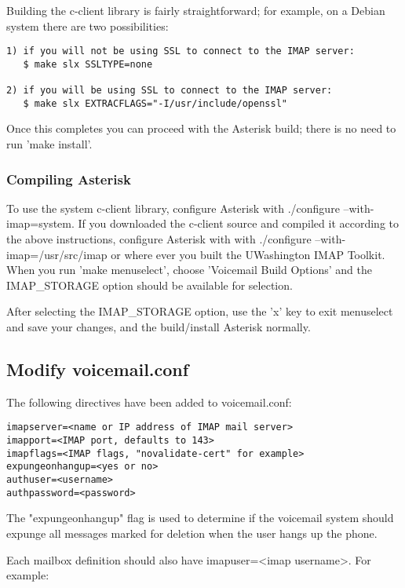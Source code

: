 Building the c-client library is fairly straightforward; for example, on a
Debian system there are two possibilities:

\begin{verbatim}
1) if you will not be using SSL to connect to the IMAP server:
   $ make slx SSLTYPE=none

2) if you will be using SSL to connect to the IMAP server:
   $ make slx EXTRACFLAGS="-I/usr/include/openssl"
\end{verbatim}

Once this completes you can proceed with the Asterisk build; there is no
need to run 'make install'.

\subsubsection{Compiling Asterisk}

To use the system c-client library, configure Asterisk with
./configure --with-imap=system. If you downloaded the c-client source
and compiled it according to the above instructions, configure
Asterisk with with ./configure --with-imap=/usr/src/imap or where ever
you built the UWashington IMAP Toolkit. When you run 'make
menuselect', choose 'Voicemail Build Options' and the IMAP\_STORAGE
option should be available for selection.

After selecting the IMAP\_STORAGE option, use the 'x' key to exit
menuselect and save your changes, and the build/install Asterisk
normally.

\subsection{Modify voicemail.conf}

The following directives have been added to voicemail.conf:

\begin{verbatim}
imapserver=<name or IP address of IMAP mail server>
imapport=<IMAP port, defaults to 143>
imapflags=<IMAP flags, "novalidate-cert" for example>
expungeonhangup=<yes or no>
authuser=<username>
authpassword=<password>
\end{verbatim}

The "expungeonhangup" flag is used to determine if the voicemail system should
expunge all messages marked for deletion when the user hangs up the phone. 

Each mailbox definition should also have imapuser=<imap username>.
For example:

